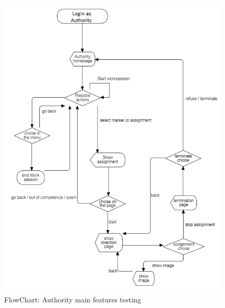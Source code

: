 \begin{figure}[H]
\centering
\includegraphics{Images/FlowChartAuthority.png}
\caption{\label{fig:ComWI}FlowChart: Authority main features testing}
\end{figure}


